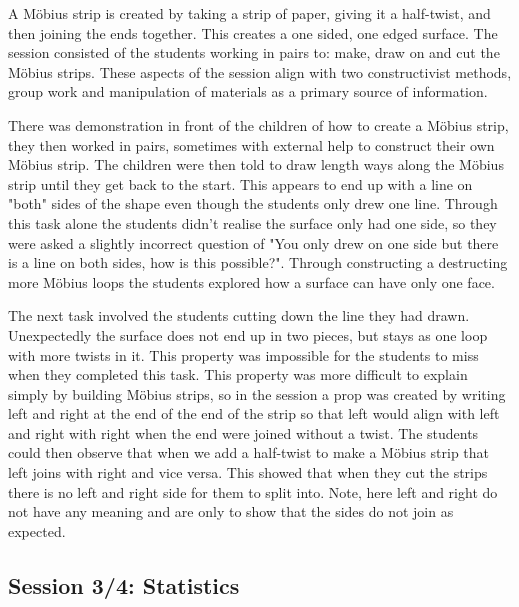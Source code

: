 \documentclass[11pt, a4paper, notitlepage]{article}
\begin{document}
A M\"obius strip is created by taking a strip of paper, giving it a half-twist, and then joining the ends together. This creates a one sided, one edged surface. The session consisted of the students working in pairs to: make, draw on and cut the M\"obius strips. These aspects of the session align with two constructivist methods, group work and manipulation of materials as a primary source of information. 
\par
There was demonstration in front of the children of how to create a M\"obius strip, they then worked in pairs, sometimes with external help to construct their own M\"obius strip. The children were then told to draw length ways along the M\"obius strip until they get back to the start. This appears to end up with a line on "both" sides of the shape even though the students only drew one line. Through this task alone the students didn't realise the surface only had one side, so they were asked a slightly incorrect question of "You only drew on one side but there is a line on both sides, how is this possible?". Through constructing a destructing more M\"obius loops the students explored how a surface can have only one face.
\par
The next task involved the students cutting down the line they had drawn. Unexpectedly the surface does not end up in two pieces, but stays as one loop with more twists in it. This property was impossible for the students to miss when they completed this task. This property was more difficult to explain simply by building M\"obius strips, so in the session a prop was created by writing left and right at the end of the end of the strip so that left would align with left and right with right when the end were joined without a twist. The students could then observe that when we add a half-twist to make a M\"obius strip that left joins with right and vice versa. This showed that when they cut the strips there is no left and right side for them to split into. Note, here left and right do not have any meaning and are only to show that the sides do not join as expected. 

\subsection{Session 3/4: Statistics}
\end{document}
